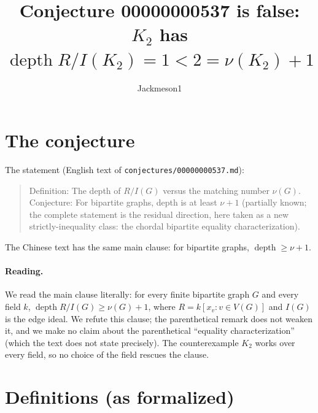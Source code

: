 \documentclass[11pt]{article}
\title{Conjecture 00000000537 is false:\\ $K_2$ has $\operatorname{depth} R/I(K_2) = 1 < 2 = \nu(K_2)+1$}
\author{Jackmeson1}
\date{}
\theoremstyle{definition}
\begin{document}
\maketitle

\section{The conjecture}

The statement (English text of \texttt{conjectures/00000000537.md}):
\begin{quote}
Definition: The depth of $R/I(G)$ versus the matching number $\nu(G)$. Conjecture: For bipartite graphs, depth is
at least $\nu + 1$ (partially known; the complete statement is the residual direction, here taken as a new
strictly-inequality class: the chordal bipartite equality characterization).
\end{quote}
The Chinese text has the same main clause: for bipartite graphs, $\operatorname{depth} \ge \nu + 1$.

\paragraph{Reading.} We read the main clause literally: for every finite bipartite graph $G$ and every field $k$,
$\operatorname{depth} R/I(G) \ge \nu(G)+1$, where $R = k[x_v : v \in V(G)]$ and $I(G)$ is the edge ideal. We refute
this clause; the parenthetical remark does not weaken it, and we make no claim about the parenthetical
``equality characterization'' (which the text does not state precisely). The counterexample $K_2$ works over
every field, so no choice of the field rescues the clause.

\section{Definitions (as formalized)}
\end{document}
